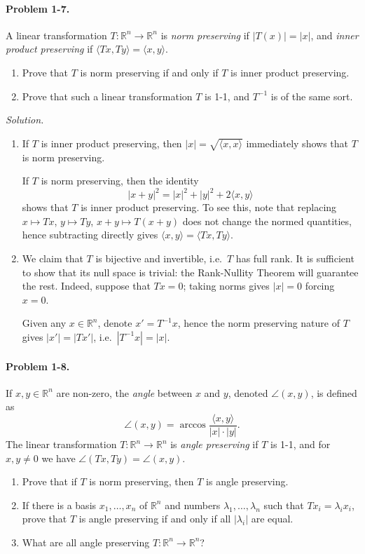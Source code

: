 \documentclass[11pt]{report}
\newcommand{\R}{\mathbb{R}}
\newcommand{\ip}[2]{\langle #1, #2 \rangle}
\newcommand{\problem}[1]{\paragraph{Problem #1.}}
\newcommand{\solution}{\noindent\textit{Solution.} }
\begin{document}
    \problem{1-7} A linear transformation $T\colon \R^n \to \R^n$ is \emph{norm
    preserving} if $|T(x)| = |x|$, and \emph{inner product preserving} if
    $\ip{Tx}{Ty} = \ip{x}{y}$.
    \begin{enumerate}
        \item Prove that $T$ is norm preserving if and only if $T$ is inner product
        preserving.
        \item Prove that such a linear transformation $T$ is 1-1, and $T^{-1}$ is of
        the same sort.
    \end{enumerate}

    \solution 
    \begin{enumerate}
        \item If $T$ is inner product preserving, then $|x| = \sqrt{\ip{x}{x}}$
        immediately shows that $T$ is norm preserving.

        If $T$ is norm preserving, then the identity \[
            |x + y|^2 = |x|^2 + |y|^2 + 2\ip{x}{y}
        \] shows that $T$ is inner product preserving. To see this, note that
        replacing $x \mapsto Tx$, $y \mapsto Ty$, $x + y \mapsto T(x + y)$ does not
        change the normed quantities, hence subtracting directly gives $\ip{x}{y} =
        \ip{Tx}{Ty}$.

        \item We claim that $T$ is bijective and invertible, i.e.\ $T$ has full rank.
        It is sufficient to show that its null space is trivial: the Rank-Nullity
        Theorem will guarantee the rest. Indeed, suppose that $Tx = 0$; taking norms
        gives $|x| = 0$ forcing $x = 0$.

        Given any $x \in \R^n$, denote $x' = T^{-1}x$, hence the norm preserving
        nature of $T$ gives $|x'| = |Tx'|$, i.e.\ $|T^{-1}x| = |x|$.
    \end{enumerate}


    \problem{1-8} If $x, y \in \R^n$ are non-zero, the \emph{angle} between $x$ and
    $y$, denoted $\angle(x, y)$, is defined as \[
        \angle(x, y) = \arccos\frac{\ip{x}{y}}{|x|\cdot |y|}.
    \] The linear transformation $T\colon \R^n \to \R^n$ is \emph{angle preserving}
    if $T$ is 1-1, and for $x, y \neq 0$ we have $\angle(Tx, Ty) = \angle(x, y)$.
    \begin{enumerate}
        \item Prove that if $T$ is norm preserving, then $T$ is angle preserving.
        \item If there is a basis $x_1, \dots, x_n$ of $\R^n$ and numbers $\lambda_1,
        \dots, \lambda_n$ such that $Tx_i = \lambda_ix_i$, prove that $T$ is angle
        preserving if and only if all $|\lambda_i|$ are equal.
        \item What are all angle preserving $T\colon \R^n \to \R^n$?
    \end{enumerate}
\end{document}
